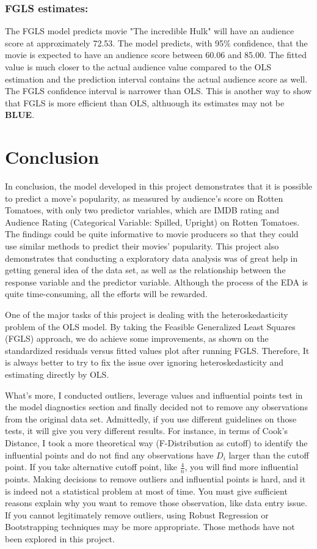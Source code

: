\documentclass{article}
\begin{document}
\subsubsection{FGLS estimates:}
The FGLS model predicts movie "The incredible Hulk" will have an audience score at approximately 
72.53. The model predicts, with 95\% confidence, that the movie is expected to have an audience score between 60.06 and 85.00. The fitted value is much closer to the actual audience value compared to the OLS estimation and the prediction interval contains the actual audience score as well. The FGLS confidence interval is narrower than OLS. This is another way to show that FGLS is more efficient than OLS, althuough its estimates may not be \textbf{BLUE}.
\newpage

\section{Conclusion}
In conclusion, the model developed in this project demonstrates that it is possible to predict a move's popularity, as measured by audience's score on Rotten Tomatoes, with only two predictor variables, which are IMDB rating and Audience Rating (Categorical Variable: Spilled, Upright) on Rotten Tomatoes. The findings could be quite informative to movie producers so that they could use similar methods to predict their movies' popularity. This project also demonstrates that conducting a exploratory data analysis was of great help in getting general idea of the data set, as well as the relationship between the response variable and the predictor variable. Although the process of the EDA is quite time-consuming, all the efforts will be rewarded. 

One of the major tasks of this project is dealing with the heteroskedasticity problem of the OLS model. By taking the Feasible Generalized Least Squares (FGLS) approach, we do achieve some improvements, as shown on the standardized residuals versus fitted values plot after running FGLS. Therefore, It is always better to try to fix the issue over ignoring heteroskedasticity and estimating directly by OLS. 

What's more, I conducted outliers, leverage values and influential points test in the model diagnostics section and finally decided not to remove any observations from the original data set. Admittedly, if you use different guidelines on those tests, it will give you very different results. For instance, in terms of Cook's Distance, I took a more theoretical way (F-Distribution as cutoff) to identify the influential points and do not find any observations have $D_{i}$ larger than the cutoff point. If you take alternative cutoff point, like $\frac{4}{n}$, you will find more influential points. Making decisions to remove outliers and influential points is hard, and it is indeed not a statistical problem at most of time. You must give sufficient reasons explain why you want to remove those observation, like data entry issue. If you cannot legitimately remove outliers, using Robust Regression or Bootstrapping techniques may be more appropriate. Those methods have not been explored in this project.
\end{document}

